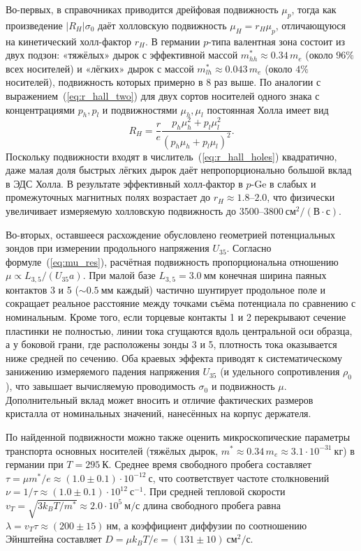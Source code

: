 \documentclass[reprint, amsmath, amssymb, aps, pra, nofootinbib]{revtex4-2}
\begin{document}
Во-первых, в справочниках приводится дрейфовая подвижность $\mu_p$, тогда как произведение $|R_H|\sigma_0$ даёт холловскую подвижность $\mu_H = r_H \mu_p$, отличающуюся на кинетический холл-фактор $r_H$.
В германии $p$-типа валентная зона состоит из двух подзон: «тяжёлых» дырок с эффективной массой $m_{hh}^* \approx 0.34\,m_e$ (около $96\%$ всех носителей) и «лёгких» дырок с массой $m_{lh}^* \approx 0.043\,m_e$ (около $4\%$ носителей), подвижность которых примерно в $8$ раз выше. По аналогии с выражением~(\ref{eq:r_hall_two}) для двух сортов носителей одного знака с концентрациями $p_h, p_l$ и подвижностями $\mu_h, \mu_l$ постоянная Холла имеет вид
\begin{equation}
R_H = \frac{r}{e} \frac{p_h \mu_h^2 + p_l \mu_l^2}{(p_h \mu_h + p_l \mu_l)^2}.
\label{eq:r_hall_holes}
\end{equation}
Поскольку подвижности входят в числитель~(\ref{eq:r_hall_holes}) квадратично, даже малая доля быстрых лёгких дырок даёт непропорционально большой вклад в ЭДС Холла. В результате эффективный холл-фактор в $p$-$\text{Ge}$ в слабых и промежуточных магнитных полях возрастает до $r_H \approx 1.8\text{--}2.0$, что физически увеличивает измеряемую холловскую подвижность до $3500\text{--}3800~\text{см}^2/(\text{В}\cdot\text{с})$.

Во-вторых, оставшееся расхождение обусловлено геометрией потенциальных зондов при измерении продольного напряжения $U_{35}$.
Согласно формуле~(\ref{eq:mu_res}), расчётная подвижность пропорциональна отношению $\mu \propto L_{3,5} / (U_{35} a)$.
При малой базе $L_{3,5} = 3.0~\text{мм}$ конечная ширина паяных контактов 3 и 5 ($\sim 0.5~\text{мм}$ каждый) частично шунтирует продольное поле и сокращает реальное расстояние между точками съёма потенциала по сравнению с номинальным.
Кроме того, если торцевые контакты 1 и 2 перекрывают сечение пластинки не полностью, линии тока сгущаются вдоль центральной оси образца, а у боковой грани, где расположены зонды 3 и 5, плотность тока оказывается ниже средней по сечению.
Оба краевых эффекта приводят к систематическому занижению измеряемого падения напряжения $U_{35}$ (и удельного сопротивления $\rho_0$), что завышает вычисляемую проводимость $\sigma_0$ и подвижность $\mu$.
Дополнительный вклад может вносить и отличие фактических размеров кристалла от номинальных значений, нанесённых на корпус держателя.

По найденной подвижности можно также оценить микроскопические параметры транспорта основных носителей (тяжёлых дырок, $m^* \approx 0.34\,m_e \approx 3.1 \cdot 10^{-31}~\text{кг}$) в германии при $T = 295~\text{К}$.
Среднее время свободного пробега составляет $\tau = \mu m^* / e \approx (1.0 \pm 0.1)\cdot 10^{-12}~\text{с}$, что соответствует частоте столкновений $\nu = 1/\tau \approx (1.0 \pm 0.1)\cdot 10^{12}~\text{с}^{-1}$.
При средней тепловой скорости $v_T = \sqrt{3 k_B T / m^*} \approx 2.0 \cdot 10^5~\text{м/с}$ длина свободного пробега равна $\lambda = v_T \tau \approx (200 \pm 15)~\text{нм}$, а коэффициент диффузии по соотношению Эйнштейна составляет $D = \mu k_B T / e = (131 \pm 10)~\text{см}^2/\text{с}$.
\end{document}
